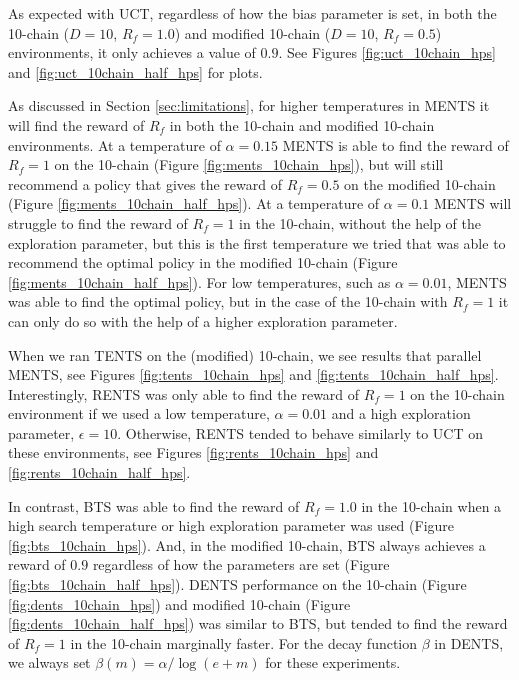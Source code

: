 \documentclass{article}
\theoremstyle{plain}
\begin{document}
\begin{appendices}
            As expected with UCT, regardless of how the bias parameter is set, in both the 10-chain ($D=10$, $R_f=1.0$) and modified 10-chain ($D=10$, $R_f=0.5$) environments, it only achieves a value of $0.9$. See Figures \ref{fig:uct_10chain_hps} and \ref{fig:uct_10chain_half_hps} for plots.

            As discussed in Section \ref{sec:limitations}, for higher temperatures in MENTS it will find the reward of $R_f$ in both the 10-chain and modified 10-chain environments. At a temperature of $\alpha=0.15$ MENTS is able to find the reward of $R_f=1$ on the 10-chain (Figure \ref{fig:ments_10chain_hps}), but will still recommend a policy that gives the reward of $R_f=0.5$ on the modified 10-chain (Figure \ref{fig:ments_10chain_half_hps}). At a temperature of $\alpha=0.1$ MENTS will struggle to find the reward of $R_f=1$ in the 10-chain, without the help of the exploration parameter, but this is the first temperature we tried that was able to recommend the optimal policy in the modified 10-chain (Figure \ref{fig:ments_10chain_half_hps}). For low temperatures, such as $\alpha=0.01$, MENTS was able to find the optimal policy, but in the case of the 10-chain with $R_f=1$ it can only do so with the help of a higher exploration parameter.

            When we ran TENTS on the (modified) 10-chain, we see results that parallel MENTS, see Figures \ref{fig:tents_10chain_hps} and \ref{fig:tents_10chain_half_hps}. Interestingly, RENTS was only able to find the reward of $R_f=1$ on the 10-chain environment if we used a low temperature, $\alpha=0.01$ and a high exploration parameter, $\epsilon=10$. Otherwise, RENTS tended to behave similarly to UCT on these environments, see Figures \ref{fig:rents_10chain_hps} and \ref{fig:rents_10chain_half_hps}.

            In contrast, BTS was able to find the reward of $R_f=1.0$ in the 10-chain when a high search temperature or high exploration parameter was used (Figure \ref{fig:bts_10chain_hps}). And, in the modified 10-chain, BTS always achieves a reward of $0.9$ regardless of how the parameters are set (Figure \ref{fig:bts_10chain_half_hps}). DENTS performance on the 10-chain (Figure \ref{fig:dents_10chain_hps}) and modified 10-chain (Figure \ref{fig:dents_10chain_half_hps}) was similar to BTS, but tended to find the reward of $R_f=1$ in the 10-chain marginally faster. For the decay function $\beta$ in DENTS, we always set $\beta(m)=\alpha/\log(e+m)$ for these experiments.


\end{appendices}
\end{document}
